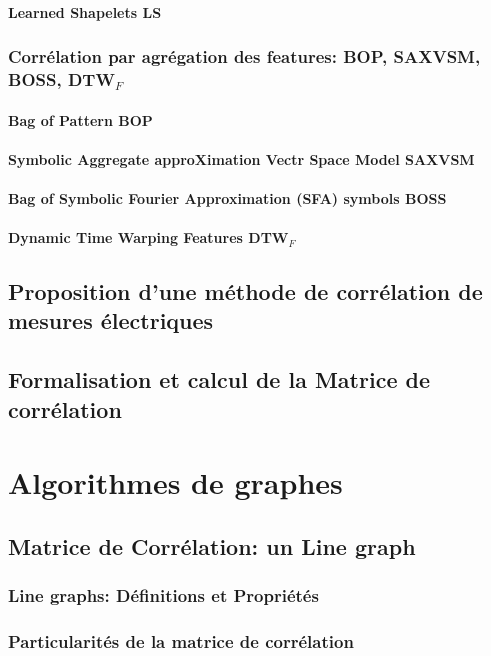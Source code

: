 			\subsubsection{Learned Shapelets LS}
		\subsection{Corr\'elation par agr\'egation des features: BOP, SAXVSM, BOSS,  DTW$_{F}$}
			\subsubsection{Bag of Pattern BOP}
			\subsubsection{Symbolic Aggregate approXimation Vectr Space Model SAXVSM}
			\subsubsection{Bag of Symbolic Fourier Approximation (SFA) symbols BOSS}
			\subsubsection{Dynamic Time Warping Features DTW$_{F}$}
	\section{Proposition d'une m\'ethode de corr\'elation de mesures \'electriques}
	\section{Formalisation et calcul de la Matrice de corr\'elation}
\chapter{Algorithmes de graphes}
	\section{Matrice de Corr\'elation: un Line graph}
		\subsection{Line graphs: D\'efinitions et Propri\'et\'es}
		\subsection{Particularit\'es de la matrice de corr\'elation}
